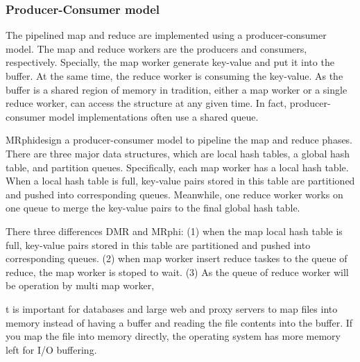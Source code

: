 


\subsubsection{Producer-Consumer model}
The pipelined map and reduce are implemented using a
producer-consumer model. 
The map and reduce workers are the producers and consumers, respectively.
Specially, the map worker generate key-value and 
put it into the buffer.
At the same time, 
the reduce worker is consuming the key-value.
As the buffer is a shared region of memory in tradition,
either a map worker or a single reduce worker,
can access the structure at any given time.
In fact, producer-consumer model implementations
often use a shared queue.

MRphi\cite{lu2013mrphi}design a producer-consumer model 
to pipeline the map and reduce phases. 
There are three major data structures, 
which are local hash tables, a global hash table, 
and partition queues. 
Specifically, each map worker has a local hash table. 
When a local hash table is full,
key-value pairs stored in this table are partitioned and
pushed into corresponding queues. 
Meanwhile, one reduce
worker works on one queue to merge the key-value pairs to
the final global hash table.

There three differences DMR and MRphi:
(1) when the map local hash table is full,
key-value pairs stored in this table are partitioned and
pushed into corresponding queues.
(2) when map worker insert reduce taskes to the queue of reduce,
the map worker is stoped to wait.
(3)%
As the queue of reduce worker will be operation by multi map worker,

t is important for databases and large web and proxy servers to map files into memory instead of having a buffer and reading the file contents into the buffer. If you map the file into memory directly, the operating system has more memory left for I/O buffering.



